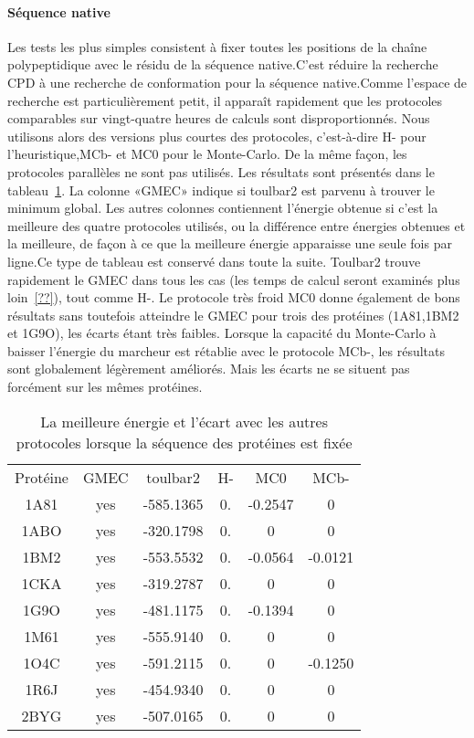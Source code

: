    \paragraph{Séquence native}
Les tests les plus simples consistent à fixer toutes les positions de la chaîne polypeptidique avec le résidu de la séquence native.C'est réduire la recherche  CPD à une recherche de conformation pour la séquence native.Comme l'espace de recherche est particulièrement petit, il apparaît rapidement que les protocoles comparables sur vingt-quatre heures de calculs sont disproportionnés. Nous utilisons alors des versions plus courtes des protocoles, c'est-à-dire H- pour l'heuristique,MCb- et MC0 pour le Monte-Carlo. De la même façon, les protocoles parallèles ne sont pas utilisés. Les résultats sont présentés dans le tableau~\ref{tab:result_no_active}. La colonne «GMEC» indique si toulbar2 est parvenu à trouver le minimum global. Les autres colonnes contiennent l'énergie obtenue si c'est la meilleure des quatre protocoles utilisés, ou la différence entre énergies obtenues et la meilleure, de façon à ce que la meilleure énergie apparaisse une seule fois par ligne.Ce type de tableau est conservé dans toute la suite.  
Toulbar2  trouve rapidement le GMEC dans tous les cas (les temps de calcul seront examinés plus loin~\ref{??}), tout comme H-. Le protocole très froid MC0 donne également de bons résultats sans toutefois atteindre le GMEC pour trois des protéines (1A81,1BM2 et 1G9O), les écarts étant très faibles. Lorsque la capacité du Monte-Carlo à baisser l'énergie du marcheur est rétablie avec le protocole MCb-, les résultats sont globalement légèrement améliorés. Mais les écarts ne se situent pas forcément sur les mêmes protéines.
    \begin{table}[h]
      \centering

      \begin{tabular}{cccccc}

        \toprule
        Protéine & GMEC & toulbar2 & H- & MC0 & MCb- \\
        \cmidrule{1-6}
        1A81 & yes & -585.1365 & 0. & -0.2547 & 0 \\
        1ABO & yes & -320.1798 & 0. & 0 & 0 \\
        1BM2 & yes & -553.5532 & 0. & -0.0564 & -0.0121 \\
        1CKA & yes & -319.2787 & 0. & 0 & 0 \\
        1G9O & yes & -481.1175 & 0. & -0.1394 & 0 \\
        1M61 & yes & -555.9140 & 0. & 0 & 0 \\
        1O4C & yes & -591.2115 & 0. & 0 & -0.1250 \\
        1R6J & yes & -454.9340 & 0. & 0 & 0 \\
        2BYG & yes & -507.0165 & 0. & 0 & 0 \\        
        \bottomrule


      \end{tabular}      
      \caption{La meilleure énergie et l'écart avec les autres protocoles lorsque la séquence des protéines est fixée}
\label{tab:result_no_active}      
    \end{table}

